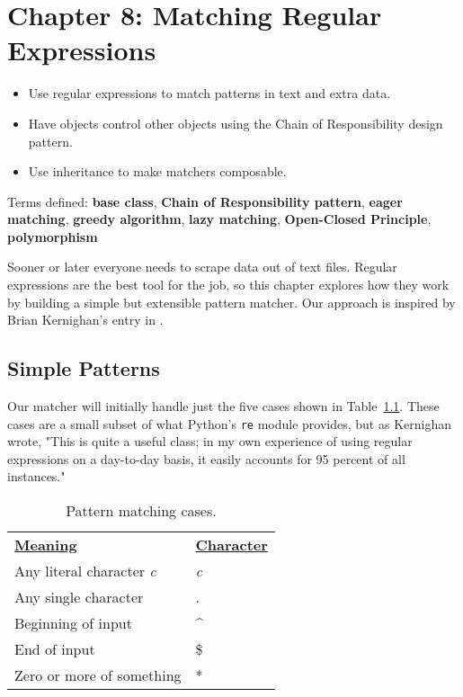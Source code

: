 \documentclass{scrbook}
\newcommand{\tblref}[1]{Table~\ref{#1}}
\newcommand{\glossref}[1]{\textbf{#1}}
\begin{document}
\chapter{Chapter 8: Matching Regular Expressions}\label{matching}

\begin{itemize}

\item Use regular expressions to match patterns in text and extra data.

\item Have objects control other objects using the Chain of Responsibility design pattern.

\item Use inheritance to make matchers composable.

\end{itemize}


\noindent 
    Terms defined:
    \glossref{base class}, \glossref{Chain of Responsibility pattern}, \glossref{eager matching}, \glossref{greedy algorithm}, \glossref{lazy matching}, \glossref{Open-Closed Principle}, \glossref{polymorphism}



Sooner or later everyone needs to scrape data out of text files.
Regular expressions are the best tool for the job,
so this chapter explores how they work by building a simple but extensible pattern matcher.
Our approach is inspired by Brian Kernighan's entry
in \cite{Oram2007}.

\section{Simple Patterns}\label{matching-simple}


Our matcher will initially handle just the five cases shown in
\tblref{pattern-matching-cases}.
These cases are a small subset of what Python's \texttt{re} module provides,
but as Kernighan wrote,
"This is quite a useful class;
in my own experience of using regular expressions on a day-to-day basis,
it easily accounts for 95 percent of all instances."

\begin{table}
\begin{tabular}{ll}
\textbf{\underline{Meaning}} & \textbf{\underline{Character}} \\
Any literal character \emph{c} & \emph{c} \\
Any single character & . \\
Beginning of input & {\textasciicircum} \\
End of input & \$ \\
Zero or more of something & * \\
\end{tabular}
\caption{Pattern matching cases.}
\label{pattern-matching-cases}
\end{table}
\end{document}
